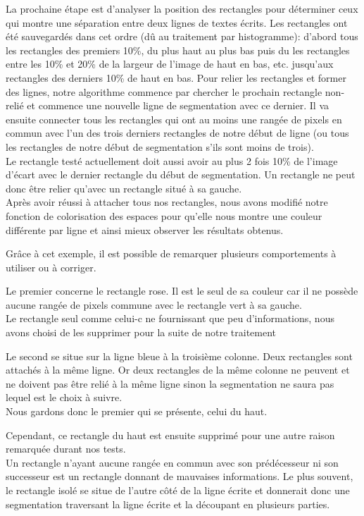 \documentclass[12pt,a4paper]{article}
\begin{document}
La prochaine étape est d'analyser la position des rectangles pour déterminer ceux qui montre une séparation entre deux lignes de textes écrits.\bigbreak
Les rectangles ont été sauvegardés dans cet ordre (dû au traitement par histogramme): d'abord tous les rectangles des premiers 10\%, du plus haut au plus bas puis du les rectangles entre les 10\% et 20\% de la largeur de l'image de haut en bas, etc. jusqu'aux rectangles des derniers 10\% de haut en bas.\bigbreak
Pour relier les rectangles et former des lignes, notre algorithme commence par chercher le prochain rectangle non-relié et commence une nouvelle ligne de segmentation avec ce dernier. Il va ensuite connecter tous les rectangles qui ont au moins une rangée de pixels en commun avec l'un des trois derniers rectangles de notre début de ligne (ou tous les rectangles de notre début de segmentation s'ils sont moins de trois).\\
Le rectangle testé actuellement doit aussi avoir au plus 2 fois 10\% de l'image d'écart avec le dernier rectangle du début de segmentation.\bigbreak
Un rectangle ne peut donc être relier qu'avec un rectangle situé à sa gauche.\\
Après avoir réussi à attacher tous nos rectangles, nous avons modifié notre fonction de colorisation des espaces pour qu'elle nous montre une couleur différente par ligne et ainsi mieux observer les résultats obtenus.



\newpage
Grâce à cet exemple, il est possible de remarquer plusieurs comportements à utiliser ou à corriger.\bigbreak

Le premier concerne le rectangle rose. Il est le seul de sa couleur car il ne possède aucune rangée de pixels commune avec le rectangle vert à sa gauche.\\
Le rectangle seul comme celui-c ne fournissant que peu d'informations, nous avons choisi de les supprimer pour la suite de notre traitement\bigbreak

Le second se situe sur la ligne bleue à la troisième colonne. Deux rectangles sont attachés à la même ligne. Or deux rectangles de la même colonne ne peuvent et ne doivent pas être relié à la même ligne sinon la segmentation ne saura pas lequel est le choix à suivre.\\
Nous gardons donc le premier qui se présente, celui du haut.\bigbreak

Cependant, ce rectangle du haut est ensuite supprimé pour une autre raison remarquée durant nos tests.\\
Un rectangle n'ayant aucune rangée en commun avec son prédécesseur ni son successeur est un rectangle donnant de mauvaises informations. Le plus souvent, le rectangle isolé se situe de l'autre côté de la ligne écrite et donnerait donc une segmentation traversant la ligne écrite et la découpant en plusieurs parties.\bigbreak
\end{document}
